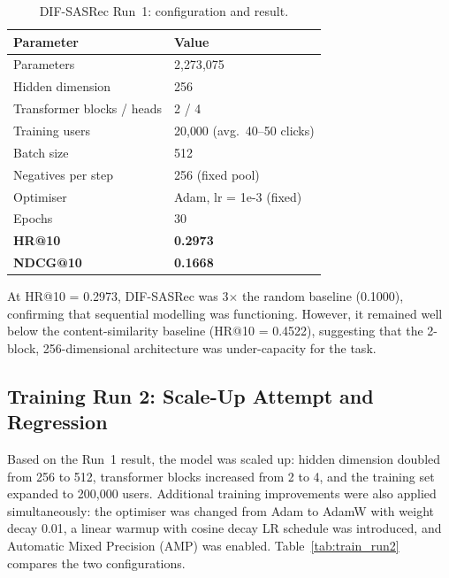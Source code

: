 \begin{table}[H]
\centering
\caption{DIF-SASRec Run~1: configuration and result.}
\label{tab:train_run1}
\begin{tabular}{ll}
\hline
\textbf{Parameter}       & \textbf{Value} \\
\hline
Parameters               & 2{,}273{,}075 \\
Hidden dimension         & 256 \\
Transformer blocks / heads & 2 / 4 \\
Training users           & 20{,}000 (avg.\ 40--50 clicks) \\
Batch size               & 512 \\
Negatives per step       & 256 (fixed pool) \\
Optimiser                & Adam, lr = 1e-3 (fixed) \\
Epochs                   & 30 \\
\hline
\textbf{HR@10}           & \textbf{0.2973} \\
\textbf{NDCG@10}         & \textbf{0.1668} \\
\hline
\end{tabular}
\end{table}

At HR@10 = 0.2973, DIF-SASRec was 3$\times$ the random baseline (0.1000), confirming that sequential modelling was functioning.
However, it remained well below the content-similarity baseline (HR@10 = 0.4522), suggesting that the 2-block, 256-dimensional architecture was under-capacity for the task.

\subsection{Training Run 2: Scale-Up Attempt and Regression}
\label{sec:train_run2}

Based on the Run~1 result, the model was scaled up: hidden dimension doubled from 256 to 512, transformer blocks increased from 2 to 4, and the training set expanded to 200{,}000 users.
Additional training improvements were also applied simultaneously: the optimiser was changed from Adam to AdamW with weight decay 0.01, a linear warmup with cosine decay LR schedule was introduced, and Automatic Mixed Precision (AMP) was enabled.
Table~\ref{tab:train_run2} compares the two configurations.

